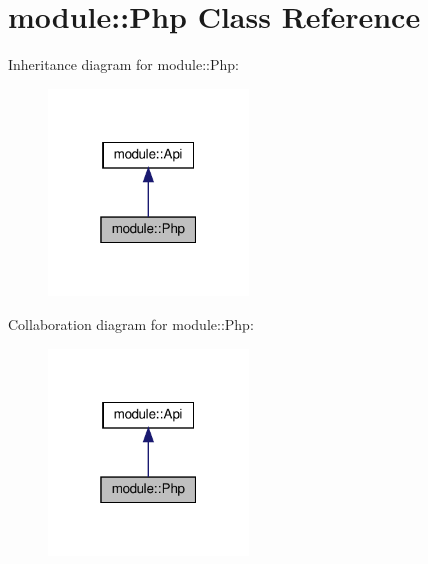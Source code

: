 \hypertarget{classmodule_1_1Php}{}\section{module\+:\+:Php Class Reference}
\label{classmodule_1_1Php}


Inheritance diagram for module\+:\+:Php\+:
\nopagebreak
\begin{figure}[H]
\begin{center}
\leavevmode
\includegraphics[width=151pt]{classmodule_1_1Php__inherit__graph}
\end{center}
\end{figure}


Collaboration diagram for module\+:\+:Php\+:
\nopagebreak
\begin{figure}[H]
\begin{center}
\leavevmode
\includegraphics[width=151pt]{classmodule_1_1Php__coll__graph}
\end{center}
\end{figure}
